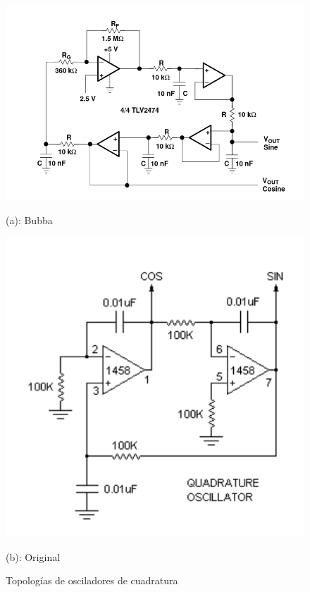 \begin{figure}[H]
    \centering
    \begin{minipage}{0.45\linewidth}
        \centering
        \includegraphics[width=1.1\linewidth]{figs/descripcion/bubba.png}
        \caption*{(a): Bubba \cite{opamps_everyone}}
    \end{minipage}
    \begin{minipage}{0.45\linewidth}
        \centering
        \includegraphics[width=0.8\linewidth]{figs/descripcion/oscilador_cuadratura.png}
        \caption*{(b): Original \cite{pong}}
    \end{minipage}
    \caption{Topologías de osciladores de cuadratura}
    \label{cuadraTopologies}
\end{figure}

